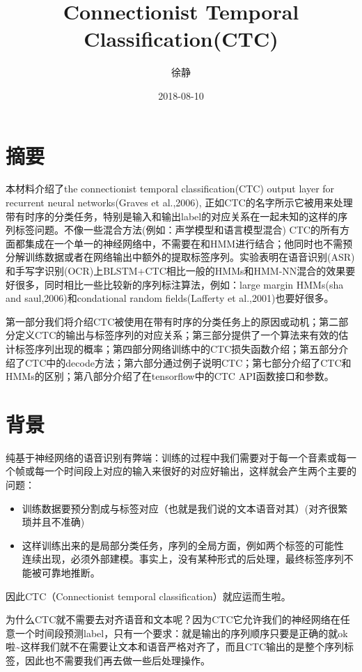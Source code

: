 \documentclass[]{book}
\title{Connectionist Temporal Classification(CTC)}
\author{徐静}
\date{2018-08-10}
\theoremstyle{definition}
\theoremstyle{definition}
\theoremstyle{definition}
\theoremstyle{remark}
\begin{document}
\maketitle

{
\setcounter{tocdepth}{1}
\tableofcontents
}
\chapter*{摘要}

本材料介绍了the connectionist temporal classification(CTC) output layer
for recurrent neural networks(Graves et al.,2006),
正如CTC的名字所示它被用来处理带有时序的分类任务，特别是输入和输出label的对应关系在一起未知的这样的序列标签问题。不像一些混合方法(例如：声学模型和语言模型混合)
CTC的所有方面都集成在一个单一的神经网络中，不需要在和HMM进行结合；他同时也不需预分解训练数据或者在网络输出中额外的提取标签序列。实验表明在语音识别(ASR)和手写字识别(OCR)上BLSTM+CTC相比一般的HMMs和HMM-NN混合的效果要好很多，同时相比一些比较新的序列标注算法，例如：large
margin HMMs(sha and saul,2006)和condational random fields(Lafferty et
al.,2001)也要好很多。

第一部分我们将介绍CTC被使用在带有时序的分类任务上的原因或动机；第二部分定义CTC的输出与标签序列的对应关系；第三部分提供了一个算法来有效的估计标签序列出现的概率；第四部分网络训练中的CTC损失函数介绍；第五部分介绍了CTC中的decode方法；第六部分通过例子说明CTC；第七部分介绍了CTC和HMMs的区别；第八部分介绍了在tensorflow中的CTC
API函数接口和参数。

\chapter{背景}\label{Background}

纯基于神经网络的语音识别有弊端：训练的过程中我们需要对于每一个音素或每一个帧或每一个时间段上对应的输入来很好的对应好输出，这样就会产生两个主要的问题：

\begin{itemize}
\item
  训练数据要预分割成与标签对应（也就是我们说的文本语音对其）(对齐很繁琐并且不准确)
\item
  这样训练出来的是局部分类任务，序列的全局方面，例如两个标签的可能性
  连续出现，必须外部建模。事实上，没有某种形式的后处理，最终标签序列不能被可靠地推断。
\end{itemize}

因此CTC（Connectionist temporal classification）就应运而生啦。

为什么CTC就不需要去对齐语音和文本呢？因为CTC它允许我们的神经网络在任意一个时间段预测label，只有一个要求：就是输出的序列顺序只要是正确的就ok啦\textasciitilde{}这样我们就不在需要让文本和语音严格对齐了，而且CTC输出的是整个序列标签，因此也不需要我们再去做一些后处理操作。
\end{document}
